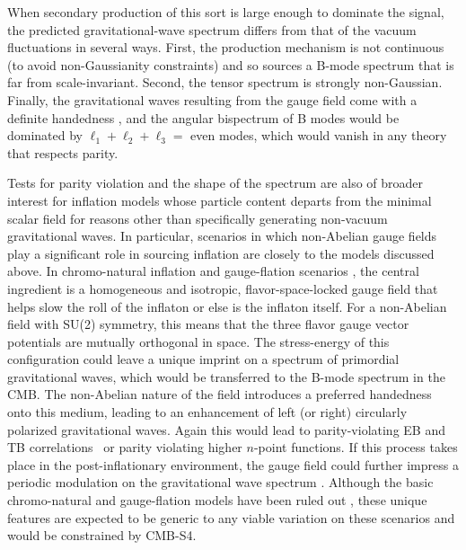 When secondary production of this sort is large enough to dominate the signal, the predicted gravitational-wave spectrum differs from that of the vacuum fluctuations in several ways. First, the production mechanism is not continuous (to avoid non-Gaussianity constraints) and so sources a B-mode spectrum that is far from scale-invariant. Second, the tensor spectrum is strongly non-Gaussian. Finally, the gravitational waves resulting from the gauge field come with a definite handedness \cite{Anber:2006xt,Sorbo:2011rz}, and the angular bispectrum of B modes would be dominated by $\ell_1+\ell_2+\ell_3=$ even modes, which would vanish in any theory that respects parity. 





Tests for parity violation and the shape of the spectrum are also of broader interest for inflation models whose particle content departs from the minimal scalar field for reasons other than specifically generating non-vacuum gravitational waves. In particular, scenarios in which non-Abelian gauge fields play a significant role in sourcing inflation are closely to the models discussed above. In chromo-natural inflation and gauge-flation scenarios \cite{Maleknejad:2011jw,Adshead:2012kp,Adshead:2012qe,Adshead:2013qp,Adshead:2013nka,Dimastrogiovanni:2012st,Dimastrogiovanni:2012ew}, the central ingredient is a homogeneous and isotropic, flavor-space-locked gauge field that helps slow the roll of the inflaton or else is the inflaton itself. For a non-Abelian field with SU(2) symmetry, this means that the three flavor gauge vector potentials are mutually orthogonal in space. The stress-energy of this configuration could leave a unique imprint on a spectrum of primordial gravitational waves, which would be transferred to the B-mode spectrum in the CMB. The non-Abelian nature of the field introduces a preferred handedness onto this medium, leading to an enhancement of left (or right) circularly polarized gravitational waves. Again this would lead to parity-violating EB and TB correlations~\cite{Lue:1998mq,Gluscevic:2010vv} or parity violating higher $n$-point functions. If this process takes place in the post-inflationary environment, the gauge field could further impress a periodic modulation on the gravitational wave spectrum \cite{Bielefeld:2014nza,Bielefeld:2015daa}. Although the basic chromo-natural and gauge-flation models have been ruled out \cite{Namba:2013kia}, these unique features are expected to be generic to any viable variation on these scenarios and would be constrained by CMB-S4.

